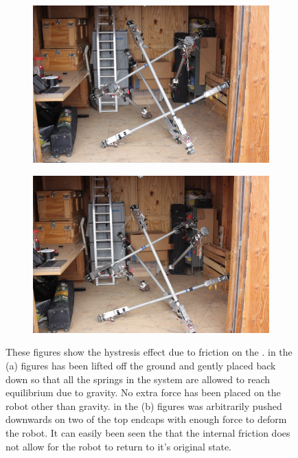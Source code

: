 \begin{appendices}
\begin{figure}[htp]
\begin{subfigure}{.5\textwidth}
\centering
\includegraphics[width=0.9\linewidth]{tex/img/full_sb_up}%
\label{fig:sb_up}%
\caption{}
\end{subfigure}%
\begin{subfigure}{.5\textwidth}
\centering
\includegraphics[width=0.9\linewidth]{tex/img/full_sb_down}%
\label{fig:sb_down}%
\caption{}
\end{subfigure}%

\caption{These figures show the hystresis effect due to friction on the \SB{}. \SB{} in the (a) figures has been lifted off the ground and gently placed back down so that all the springs in the system are allowed to reach equilibrium due to gravity. No extra force has been placed on the robot other than gravity. \SB{} in the (b) figures was arbitrarily pushed downwards on two of the top endcaps with enough force to deform the robot. It can easily been seen the that the internal friction does not allow for the robot to return to it's original state.}
\label{fig:cable_friction}
\end{figure}


\end{appendices}
